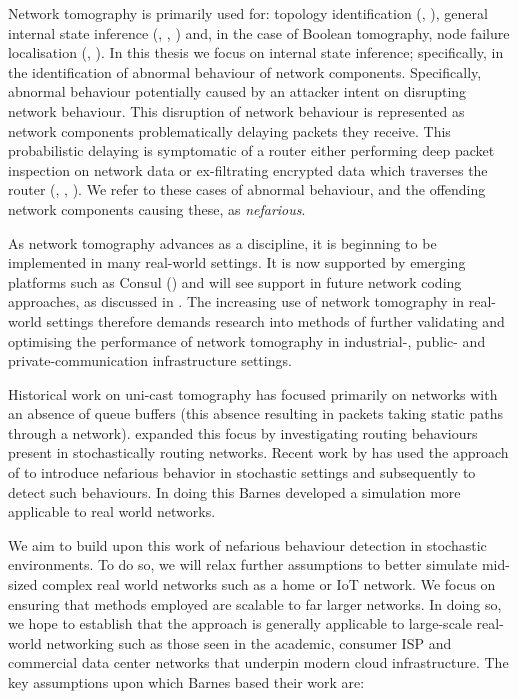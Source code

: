 Network tomography is primarily used for: topology identification (\cite{zhang_topology_2014}, \cite{hailiang_network_2009}), general internal state inference (\cite{vardi_network_1996}, \cite{coates_network_2001}, \cite{he_network_2021}) and, in the case of Boolean tomography, node failure localisation (\cite{nguyen_boolean_2007}, \cite{ma_optimal_2015}). In this thesis we focus on internal state inference; specifically, in the identification of abnormal behaviour of network components. Specifically, abnormal behaviour potentially caused by an attacker intent on disrupting network behaviour. This disruption of network behaviour is represented as network components problematically delaying packets they receive. This probabilistic delaying is symptomatic of a router either performing deep packet inspection on network data or ex-filtrating encrypted data which traverses the router (\cite{potteiger_evaluating_2017}, \cite{ullah_data_2018}, \cite{dorazio_data_2017}). We refer to these cases of abnormal behaviour, and the offending network components causing these, as \textit{nefarious}.\par
As network tomography advances as a discipline, it is beginning to be implemented in many real-world settings. It is now supported by emerging platforms such as Consul (\cite{shilton_network_2021}) and will see support in future network coding approaches, as discussed in \cite{kakkavas_review_2020}. The increasing use of network tomography in real-world settings therefore demands research into methods of further validating and optimising the performance of network tomography in industrial-, public- and private-communication infrastructure settings.\par
Historical work on uni-cast tomography has focused primarily on networks with an absence of queue buffers (this absence resulting in packets taking static paths through a network). \cite{lai_measuring_2000} expanded this focus by investigating routing behaviours present in stochastically routing networks. Recent work by \cite{barnes_stochastic_2020} has used the approach of \cite{lai_measuring_2000} to introduce nefarious behavior in stochastic settings and subsequently to detect such behaviours. In doing this Barnes developed a simulation more applicable to real world networks.\par
We aim to build upon this work of nefarious behaviour detection in stochastic environments. To do so, we will relax further assumptions to better simulate mid-sized complex real world networks such as a home or IoT network. We focus on ensuring that methods employed are scalable to far larger networks. In doing so, we hope to establish that the approach is generally applicable to large-scale real-world networking such as those seen in the academic, consumer ISP and commercial data center networks that underpin modern cloud infrastructure. The key assumptions upon which Barnes based their work are:\par
